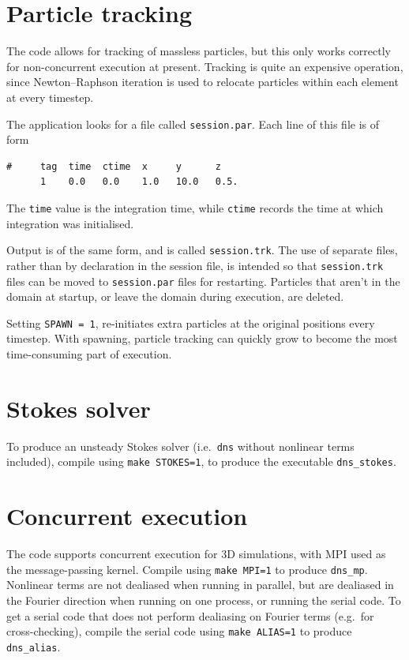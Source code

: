 \documentclass[11pt,a4paper]{report}
\begin{document}
\section{Particle tracking}

The code allows for tracking of massless particles, but this only
works correctly for non-concurrent execution at present.  Tracking is
quite an expensive operation, since Newton--Raphson iteration is used
to relocate particles within each element at every timestep.

The application looks for a file called \verb+session.par+.  Each line
of this file is of form
\begin{verbatim}
#     tag  time  ctime  x     y      z
      1    0.0   0.0    1.0   10.0   0.5.
\end{verbatim}
The \verb+time+ value is the integration time, while \verb+ctime+
records the time at which integration was initialised.

Output is of the same form, and is called \verb+session.trk+.  The use
of separate files, rather than by declaration in the session file, is
intended so that \verb+session.trk+ files can be moved to
\verb+session.par+ files for restarting.  Particles that aren't in the
domain at startup, or leave the domain during execution, are deleted.

Setting \verb+SPAWN = 1+, re-initiates extra particles at the original
positions every timestep.  With spawning, particle tracking can
quickly grow to become the most time-consuming part of execution.

\section{Stokes solver}

To produce an unsteady Stokes solver (i.e.\ \verb+dns+ without
nonlinear terms included), compile using \verb+make STOKES=1+, to
produce the executable \verb+dns_stokes+.

\section{Concurrent execution}

The code supports concurrent execution for 3D simulations, with MPI
used as the message-passing kernel. Compile using \verb+make MPI=1+
to produce \verb+dns_mp+.  Nonlinear terms are not dealiased when
running in parallel, but are dealiased in the Fourier direction when
running on one process, or running the serial code. To get a serial
code that does not perform dealiasing on Fourier terms (e.g.\ for
cross-checking), compile the serial code using \verb+make ALIAS=1+
to produce \verb+dns_alias+.





\end{document}
